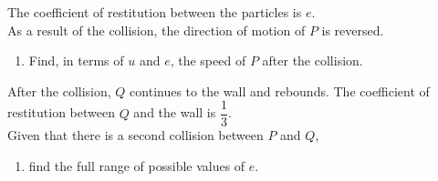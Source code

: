 \documentclass[leqno]{article}
\begin{document}
\begin{enumerate}[
  label=\textbf{\arabic*.},
  leftmargin=*,
  topsep=0pt,
  partopsep=0pt,
  parsep=0pt
]
The coefficient of restitution between the particles is $e$. \\

As a result of the collision, the direction of motion of $P$ is reversed. \\

\begin{enumerate}[label=\textbf{(\alph*)}]
  \item Find, in terms of $u$ and $e$, the speed of $P$ after the collision.  \\
\end{enumerate}
After the collision, $Q$ continues to the wall and rebounds. The coefficient of restitution between $Q$ and the wall is $\dfrac{1}{3}$. \\

Given that there is a second collision between $P$ and $Q$, \\

\begin{enumerate}[label=\textbf{(\alph*)}, resume]
  \item find the full range of possible values of $e$.  \\
\end{enumerate}

\end{enumerate}
\end{document}
